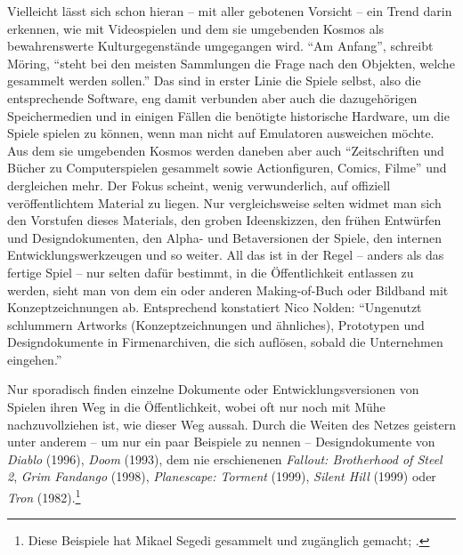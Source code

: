 \documentclass[a5paper,pagesize,numbers=noenddot]{scrbook}
\begin{document}
Vielleicht lässt sich schon hieran -- mit aller gebotenen Vorsicht -- ein Trend darin erkennen, wie mit Videospielen und dem sie umgebenden Kosmos als bewahrenswerte Kulturgegenstände umgegangen wird.
\enquote{Am Anfang}, schreibt Möring, \enquote{steht bei den meisten Sammlungen die Frage nach den Objekten, welche gesammelt werden sollen.}\autocite[S.~121]{moering_kulturarchive_2020}
Das sind in erster Linie die Spiele selbst, also die entsprechende Software, eng damit verbunden aber auch die dazugehörigen Speichermedien und in einigen Fällen die benötigte historische Hardware, um die Spiele spielen zu können, wenn man nicht auf Emulatoren ausweichen möchte.
Aus dem sie umgebenden Kosmos werden daneben aber auch \enquote{Zeitschriften und Bücher zu Computerspielen gesammelt sowie Actionfiguren, Comics, Filme}\autocite[S.~121]{moering_kulturarchive_2020} und dergleichen mehr.
Der Fokus scheint, wenig verwunderlich, auf offiziell veröffentlichtem Material zu liegen.
Nur vergleichsweise selten widmet man sich den Vorstufen dieses Materials, den groben Ideenskizzen, den frühen Entwürfen und Designdokumenten, den Alpha- und Betaversionen der Spiele, den internen Entwicklungswerkzeugen und so weiter.
All das ist in der Regel -- anders als das fertige Spiel -- nur selten dafür bestimmt, in die Öffentlichkeit entlassen zu werden, sieht man von dem ein oder anderen Making-of-Buch oder Bildband mit Konzeptzeichnungen ab.
Entsprechend konstatiert Nico Nolden:
\enquote{Ungenutzt schlummern Artworks (Konzeptzeichnungen und ähnliches), Prototypen und Designdokumente in Firmenarchiven, die sich auf‌lösen, sobald die Unternehmen eingehen.}\autocite[S.~44]{nolden_geschichte_2020}

Nur sporadisch finden einzelne Dokumente oder Entwicklungsversionen von Spielen ihren Weg in die Öffentlichkeit, wobei oft nur noch mit Mühe nachzuvollziehen ist, wie dieser Weg aussah.
Durch die Weiten des Netzes geistern unter anderem -- um nur ein paar Beispiele zu nennen -- Designdokumente von \textit{Diablo} (1996), \textit{Doom} (1993), dem nie erschienenen \textit{Fallout: Brotherhood of Steel 2}, \textit{Grim Fandango} (1998), \textit{Planescape: Torment} (1999), \textit{Silent Hill} (1999) oder \textit{Tron} (1982).\footnote{Diese Beispiele hat Mikael Segedi gesammelt und zugänglich gemacht; \autocite[vgl.][]{segedi_famous_2015}.}
\end{document}
